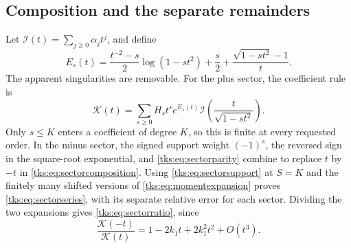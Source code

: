 \subsection{Composition and the separate remainders}
Let $\mathcal I(t)=\sum_{j\geq0}\alpha_jt^j$, and define
\[
E_s(t)=\frac{t^{-2}-s}{2}\log(1-st^2)+\frac s2
                        +\frac{\sqrt{1-st^2}-1}{t}.
\]
The apparent singularities are removable. For the plus sector, the coefficient rule is
\begin{equation}\label{tks:eq:sectorcomposition}
\mathcal K(t)=\sum_{s\geq0}H_st^s e^{E_s(t)}
                    \mathcal I\left(\frac{t}{\sqrt{1-st^2}}\right).
\end{equation}
Only $s\leq K$ enters a coefficient of degree $K$, so this is finite at every requested order. In the minus sector, the signed support weight $(-1)^s$, the reversed sign in the square-root exponential, and \eqref{tks:eq:sectorparity} combine to replace $t$ by $-t$ in \eqref{tks:eq:sectorcomposition}. Using \eqref{tks:eq:sectorsupport} at $S=K$ and the finitely many shifted versions of \eqref{tks:eq:momentexpansion} proves \eqref{tks:eq:sectorseries}, with its separate relative error for each sector. Dividing the two expansions gives \eqref{tks:eq:sectorratio}, since
\[
\frac{\mathcal K(-t)}{\mathcal K(t)}
 =1-2k_1t+2k_1^2t^2+O(t^3).
\]

